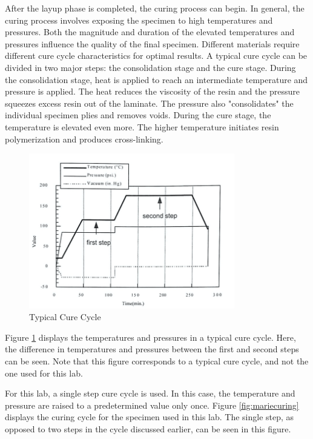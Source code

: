 After the layup phase is completed, the curing process can begin. In general, the curing process involves exposing the specimen to high temperatures and pressures. Both the magnitude and duration of the elevated temperatures and pressures influence the quality of the final specimen. Different materials require different cure cycle characteristics for optimal results. A typical cure cycle can be divided in two major steps: the consolidation stage and the cure stage. During the consolidation stage, heat is applied to reach an intermediate temperature and pressure is applied. The heat reduces the viscosity of the resin and the pressure squeezes excess resin out of the laminate. The pressure also "consolidates" the individual specimen plies and removes voids.  During the cure stage, the temperature is elevated even more. The higher temperature initiates resin polymerization and produces cross-linking. 

\begin{figure}[H]
    \centering
    \includegraphics[width=0.8\textwidth]{Pictures/Lab1: Q 1.10/typical_cure.jpg}
    \caption{Typical Cure Cycle\cite{labmanual}}
    \label{fig:typicalcure}
\end{figure}

Figure \ref{fig:typicalcure} displays the temperatures and pressures in a typical cure cycle. Here, the difference in temperatures and pressures between the first and second steps can be seen. Note that this figure corresponds to a typical cure cycle, and not the one used for this lab.

For this lab, a single step cure cycle is used. In this case, the temperature and pressure are raised to a predetermined value only once. Figure \ref{fig:mariecuring} displays the curing cycle for the specimen used in this lab. The single step, as opposed to two steps in the cycle discussed earlier, can be seen in this figure.

